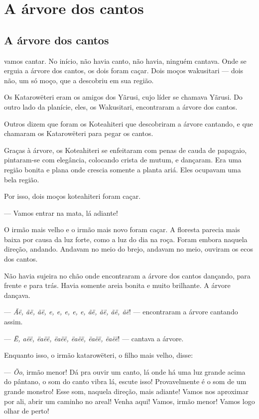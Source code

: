 
\part{A árvore dos cantos}

\chapter{A árvore dos cantos}

 vamos cantar. No início, não havia canto, não havia, ninguém
cantava. Onde se erguia a árvore dos cantos, os dois foram caçar. Dois
moços wakusitari --- dois não, um só moço, que a descobriu em sua região.

Os Katarowëteri eram os amigos dos Yãrusi, cujo líder se chamava Yãrusi.
 Do outro lado da planície, eles, os Wakusitari, encontraram a árvore dos
 cantos.

Outros dizem que foram os Koteahiteri que descobriram a árvore cantando,
 e que chamaram os Katarowëteri para pegar os cantos.

Graças à árvore, os Koteahiteri se enfeitaram com penas de cauda de
papagaio, pintaram-se com elegância, colocando crista de mutum, e
dançaram. Era uma região bonita e plana onde crescia somente a planta
ariá. Eles ocupavam uma bela região. 

Por isso, dois moços koteahiteri foram caçar. 

--- Vamos entrar na mata, lá adiante! 

O irmão mais velho e o irmão mais novo foram caçar. A floresta parecia
mais baixa por causa da luz forte, como a luz do dia na roça. Foram
embora naquela direção, andando. Andavam no meio do brejo, andavam no
meio, ouviram os ecos dos cantos. 

Não havia sujeira no chão onde encontraram a árvore dos cantos dançando,
 para frente e para trás. Havia somente areia bonita e muito brilhante. A
 árvore dançava.

--- \textit{Ãë, ãë, ãë, e, e, e, e, e, ãë, ãë, ãë, ãë}! --- encontraram a árvore
 cantando assim. 

--- \textit{Ë, aëë, ëaëë, ëaëë, ëaëë, ëaëë, ëaëë}! --- cantava a árvore. 

Enquanto isso, o irmão katarowëteri, o filho mais velho, disse: 

--- \textit{Õo}, irmão menor! Dá pra ouvir um canto, lá onde há uma luz grande
 acima do pântano, o som do canto vibra lá, escute isso! Provavelmente é
 o som de um grande monstro! Esse som, naquela direção, mais adiante!
 Vamos nos aproximar por ali, abrir um caminho no areal! Venha aqui!
 Vamos, irmão menor! Vamos logo olhar de perto!

